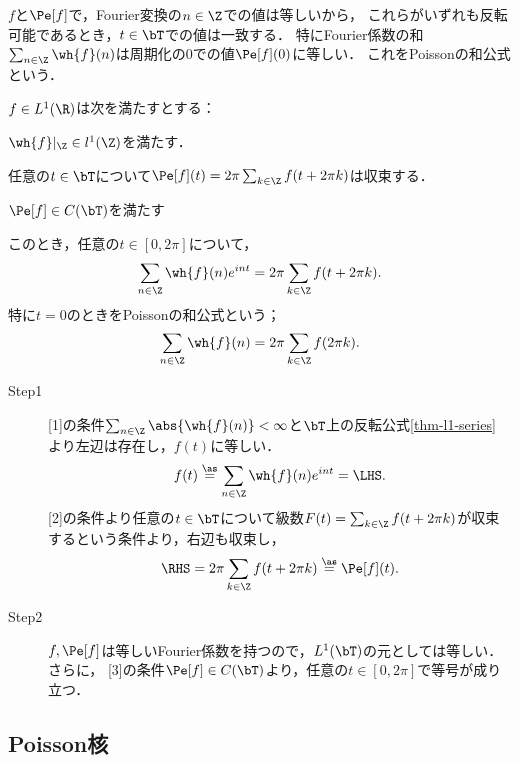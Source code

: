 \documentclass[uplatex,dvipdfmx]{jsreport}
\begin{document}
\begin{tcolorbox}[colframe=ForestGreen, colback=ForestGreen!10!white,breakable,colbacktitle=ForestGreen!40!white,coltitle=black,fonttitle=\bfseries\sffamily,
title=]
    $f$と$\Pe[f]$で，Fourier変換の$n\in\Z$での値は等しいから，
    これらがいずれも反転可能であるとき，$t\in\bT$での値は一致する．
    特にFourier係数の和$\sum_{n\in\Z}\wh{f}(n)$は周期化の$0$での値$\Pe[f](0)$に等しい．
    これをPoissonの和公式という．
\end{tcolorbox}

\begin{proposition}
    $f\in L^1(\R)$は次を満たすとする：
    \begin{enumerate}[{[}1{]}]
        \item $\wh{f}|_\Z\in l^1(\Z)$を満たす．
        \item 任意の$t\in\bT$について$\Pe[f](t)=2\pi\sum_{k\in\Z}f(t+2\pi k)$は収束する．
        \item $\Pe[f]\in C(\bT)$を満たす
    \end{enumerate}
    このとき，任意の$t\in[0,2\pi]$について，
    \[\sum_{n\in\Z}\wh{f}(n)e^{int}=2\pi\sum_{k\in\Z}f(t+2\pi k).\]
    特に$t=0$のときをPoissonの和公式という；
    \[\sum_{n\in\Z}\wh{f}(n)=2\pi\sum_{k\in\Z}f(2\pi k).\]
\end{proposition}
\begin{Proof}\mbox{}
    \begin{description}
        \item[Step1] [1]の条件$\sum_{n\in\Z}\abs{\wh{f}(n)}<\infty$と$\bT$上の反転公式\ref{thm-l1-series}
        より左辺は存在し，$f(t)$に等しい．
        \[f(t)\overset{\as}{=}\sum_{n\in\Z}\wh{f}(n)e^{int}=\LHS.\]
        [2]の条件より任意の$t\in\bT$について級数$F(t)=\sum_{k\in\Z}f(t+2\pi k)$が収束するという条件より，右辺も収束し，
        \[\RHS=2\pi\sum_{k\in\Z}f(t+2\pi k)\overset{\as}{=}\Pe[f](t).\]
        \item[Step2] $f,\Pe[f]$は等しいFourier係数を持つので，$L^1(\bT)$の元としては等しい．
        さらに，
        [3]の条件$\Pe[f]\in C(\bT)$より，任意の$t\in[0,2\pi]$で等号が成り立つ．
    \end{description}
\end{Proof}

\subsection{Poisson核}
\end{document}
